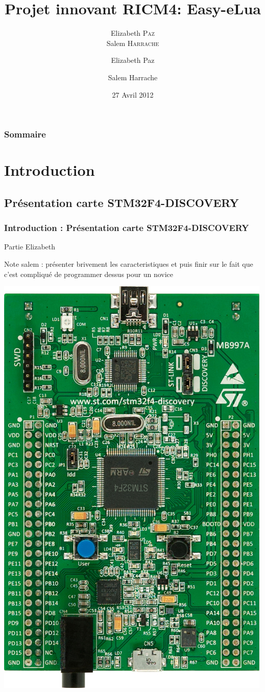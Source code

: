 \documentclass{beamer}
\title{Projet innovant RICM4: Easy-eLua}
\author{Elizabeth \textsc{Paz} \\ Salem \textsc{Harrache}}
\institute{Polytech'Grenoble \\
Olivier \textsc{Richard} \\
Didier \textsc{Donsez} \\
}
\author[Elizabeth Paz, Salem Harrache]
{Elizabeth Paz \and Salem Harrache}
\date{27 Avril 2012}
\begin{document}
\begin{frame}
 \maketitle
\end{frame}

\begin{frame}
\frametitle{Sommaire}
\tableofcontents
\end{frame}

\section{Introduction}
\subsection{Présentation carte STM32F4-DISCOVERY}
\begin{frame}
\frametitle{Introduction : Présentation carte STM32F4-DISCOVERY}
Partie Elizabeth 

Note salem : présenter brivement les caracteristiques et puis finir sur le fait que 
c'est compliqué de programmer dessus pour un novice
\begin{center}
 \includegraphics[scale=0.1]{../images/stm32f4_discovery.jpg}
\end{center}
\end{frame}
\end{document}
